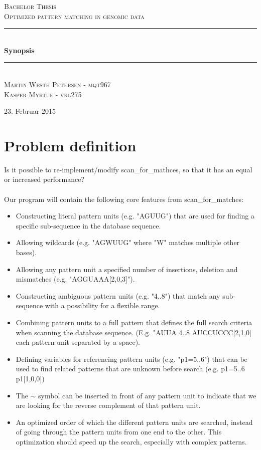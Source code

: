 \documentclass[12pt]{article}
\newcommand{\HRule}{\rule{\linewidth}{0.5mm}}
\begin{document}
\begin{titlepage}
\begin{center}

\textsc{\Large Bachelor Thesis \\ Optimized pattern matching in genomic data\\[0.3cm]}
\HRule \\[0.4cm]
{ \LARGE \bfseries Synopsis}\\[0.4cm]
\HRule \\[1.2cm]
\textsc{\large Martin Westh Petersen - mqt967 \\ Kasper Myrtue - vkl275}\\[1.0cm]
\end{center}
\begin{center}
\vfill
{\large 23. Februar 2015}
\end{center}
\end{titlepage}
\section{Problem definition}
Is it possible to re-implement/modify scan\_for\_mathces, so that it has an equal or
increased performance? \\ \\
Our program will contain the following core features from scan\_for\_matches:
\begin{itemize}
\item Constructing literal pattern units (e.g. "AGUUG") that are used for finding a specific sub-sequence in the 
database sequence.
\item Allowing wildcards (e.g. "AGWUUG" where "W" matches multiple other bases).
\item Allowing any pattern unit a specified number of insertions, deletion and mismatches (e.g. "AGGUAAA[2,0,3]").
\item Constructing ambiguous pattern units (e.g. "4..8") that match any sub-sequence with a possibility for a 
flexible range.
\item Combining pattern units to a full pattern that defines the full search criteria when scanning the database sequence.
(E.g. "AUUA  4..8  AUCCUCCC[2,1,0] each pattern unit separated by a space).
\item Defining variables for referencing pattern units (e.g. "p1=5..6") that can be used 
to find related patterns that are unknown before search (e.g. p1=5..6 p1[1,0,0])
\item The $\sim$ symbol can be inserted in front of any pattern unit to indicate that we are looking for the reverse
complement of that pattern unit.
\item An optimized order of which the different pattern units are searched, instead of going through the pattern units
from one end to the other. This optimization should speed up the search, especially with complex patterns.
\end{itemize}
\end{document}

